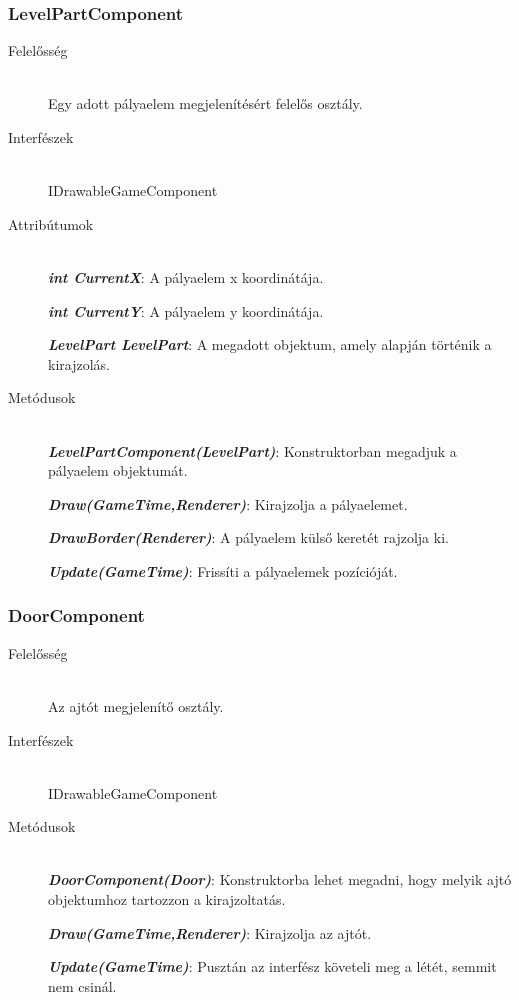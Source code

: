 \subsubsection{LevelPartComponent}
	\begin{description}
		\item[Felelősség] \hfill \\
		Egy adott pályaelem megjelenítésért felelős osztály.
		\item[Interfészek] \hfill \\
		IDrawableGameComponent

		\item[Attribútumok] \hfill \\
		\textbf{\emph{int CurrentX}}: A pályaelem x koordinátája.

		\textbf{\emph{int CurrentY}}: A pályaelem y koordinátája.

		\textbf{\emph{LevelPart LevelPart}}: A megadott objektum, amely alapján történik a kirajzolás.
		
		\item[Metódusok] \hfill \\
		\textbf{\emph{LevelPartComponent(LevelPart)}}: Konstruktorban megadjuk a pályaelem objektumát.

		\textbf{\emph{Draw(GameTime,Renderer)}}: Kirajzolja a pályaelemet.

		\textbf{\emph{DrawBorder(Renderer)}}: A pályaelem külső keretét rajzolja ki.

		\textbf{\emph{Update(GameTime)}}: Frissíti a pályaelemek pozícióját.
	\end{description}
	
\subsubsection{DoorComponent}
	\begin{description}
		\item[Felelősség] \hfill \\
		Az ajtót megjelenítő osztály.
		\item[Interfészek] \hfill \\
		IDrawableGameComponent

		\item[Metódusok] \hfill \\
		\textbf{\emph{DoorComponent(Door)}}: Konstruktorba lehet megadni, hogy melyik ajtó objektumhoz tartozzon a kirajzoltatás.

		\textbf{\emph{Draw(GameTime,Renderer)}}: Kirajzolja az ajtót.

		\textbf{\emph{Update(GameTime)}}: Pusztán az interfész követeli meg a létét, semmit nem csinál.
	\end{description}
	
